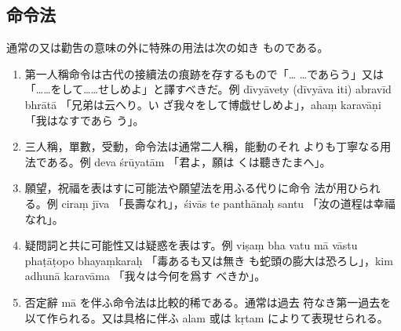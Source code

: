 \subsection{命令法}
\numberParagraph
通常の又は勸吿の意味の外に特殊の用法は次の如き
ものである。
\begin{enumerate}[label=(\alph*)]
\item 第一人稱命令は古代の接續法の痕跡を存するもので「…
…であらう」又は「……をして……せしめよ」と譯すべきだ。例
dīvyāvety (dīvyāva iti) abravīd bhrātā 「兄弟は云へり。い
ざ我々をして博戯せしめよ」，ahaṃ karavāṇi 「我はなすであら
う」。
\item 三人稱，單數，受動，命令法は通常二人稱，能動のそれ
よりも丁寧なる用法である。例 deva śrūyatām 「君よ，願は
くは聽きたまへ」。
\item 願望，祝福を表はすに可能法や願望法を用ふる代りに命令
法が用ひられる。例 ciraṃ jīva 「長壽なれ」，śivās te
panthānaḥ santu 「汝の道程は幸福なれ」。
\item 疑問詞と共に可能性又は疑惑を表はす。例 viṣaṃ bha\-%
vatu mā vāstu phaṭāṭopo bhayaṃkaraḥ 「毒あるも又は無き
も蛇頭の膨大は恐ろし」，kim adhunā karavāma 「我々は今何を爲す
べきか」。
\item 否定辭 mā を伴ふ命令法は比較的稀である。通常は過去
符なき第一過去を以て作られる。又は具格に伴ふ alam 或は
kṛtam によりて表現せられる。
\end{enumerate}

